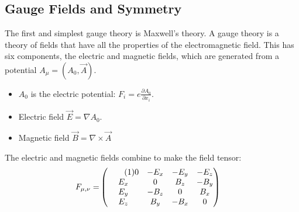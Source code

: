 \documentclass[]{article}
\newcommand\numberthis{\addtocounter{equation}{1}\tag{\theequation}}
\begin{document}
\subsection{Gauge Fields and Symmetry}

The first and simplest gauge theory is Maxwell's theory. A gauge theory is a theory of fields that have all the properties of the electromagnetic field. This has six components, the electric and magnetic fields, which are generated from a potential $A_\mu=(A_0,\vec{A})$.
\begin{itemize}
	\item  $A_0$ is the electric potential: $F_i=e \frac{\partial A_0}{\partial x_i}$.
	\item Electric field $\vec{E}=\nabla A_0$.
	\item Magnetic field $\vec{B}=\nabla \times \vec{A}$
\end{itemize}

The electric and magnetic fields combine to make the field tensor\cite{susskind2017special}:
\begin{align*}
	F_{\mu,\nu} =&\begin{pmatrix} \numberthis \label{eq:field:tensor}
		0&-E_x&-E_y&-E_z\\
		E_x&0&B_z&-B_y\\
		E_y&-B_z&0&B_x\\
		E_z&B_y&-B_x&0
	\end{pmatrix}
\end{align*}
\end{document}
